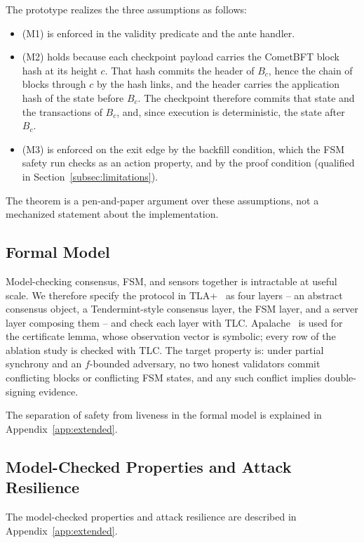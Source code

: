 The prototype realizes the three assumptions as follows:
\begin{itemize}
  \item (M1) is enforced in the validity predicate and the ante handler.
  \item (M2) holds because each checkpoint payload carries the CometBFT block
  hash at its height $c$. That hash commits the header of $B_c$, hence the
  chain of blocks through $c$ by the hash links, and the header carries the
  application hash of the state before $B_c$. The checkpoint therefore commits
  that state and the transactions of $B_c$, and, since execution is
  deterministic, the state after $B_c$.
  \item (M3) is enforced on the exit edge by the backfill condition, which the
  FSM safety run checks as an action property, and by the proof condition
  (qualified in Section~\ref{subsec:limitations}).
\end{itemize}
The theorem is a pen-and-paper argument over these assumptions, not a
mechanized statement about the implementation.

\subsection{Formal Model}

Model-checking consensus, FSM, and sensors together is intractable at useful
scale. We therefore specify the protocol in TLA+~\cite{lamport2002specifying}
as four layers -- an abstract consensus object, a Tendermint-style consensus
layer, the FSM layer, and a server layer composing them -- and check each
layer with TLC. Apalache~\cite{konnov2019apalache} is used for the certificate
lemma, whose observation vector is symbolic; every row of the ablation study is
checked with TLC.
The target property is: under partial synchrony and an $f$-bounded
adversary, no two honest validators commit conflicting blocks or conflicting
FSM states, and any such conflict implies double-signing evidence.

The separation of safety from liveness in the formal model is explained in Appendix~\ref{app:extended}.


\subsection{Model-Checked Properties and Attack Resilience}
The model-checked properties and attack resilience are described in Appendix~\ref{app:extended}.

